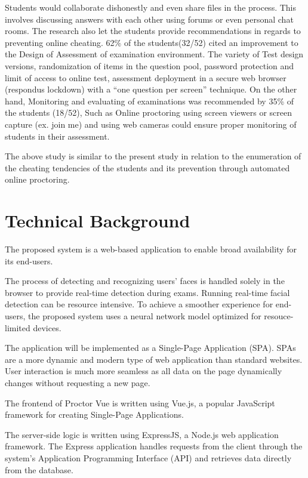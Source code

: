 Students would collaborate dishonestly and even share files in the process.
This involves discussing answers with each other using forums or even personal chat rooms.
The research also let the students provide recommendations in regards to preventing online cheating.
62\% of the students(32/52) cited an improvement to the Design of Assessment of examination environment.
The variety of Test design versions, randomization of items in the question pool, password protection and limit of access to online test, assessment deployment in a secure web browser (respondus lockdown) with a “one question per screen” technique.
On the other hand, Monitoring and evaluating of examinations was recommended by 35\% of the students (18/52), Such as Online proctoring using screen viewers or screen capture (ex. join me) and using web cameras could ensure proper monitoring of students in their assessment.

The above study is similar to the present study in relation to the enumeration of the cheating tendencies of the students and its prevention through automated online proctoring.

\section{Technical Background}

The proposed system is a web-based application to enable broad availability for its end-users.

The process of detecting and recognizing users' faces is handled solely in the browser to provide real-time detection during exams.
Running real-time facial detection can be resource intensive.
To achieve a smoother experience for end-users, the proposed system uses a neural network model optimized for resouce-limited devices.

The application will be implemented as a Single-Page Application (SPA).
SPAs are a more dynamic and modern type of web application than standard websites.
User interaction is much more seamless as all data on the page dynamically changes without requesting a new page.

The frontend of Proctor Vue is written using Vue.js, a popular JavaScript framework for creating Single-Page Applications.

The server-side logic is written using ExpressJS, a Node.js web application framework.
The Express application handles requests from the client through the system's Application Programming Interface (API) and retrieves data directly from the database.

